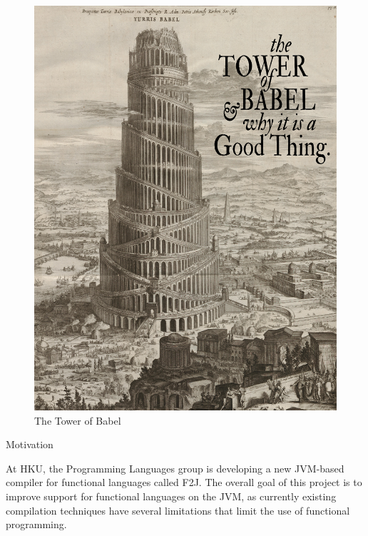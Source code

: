 \documentclass[final]{beamer}
\newlength{\onecolwid}
\begin{document}
\begin{frame}[t]
\begin{columns}[t]
\begin{column}{\onecolwid}
\begin{figure}
\includegraphics[width=\linewidth]{img/babellong.png}
\caption{The Tower of Babel}
\end{figure}


\begin{block}{Motivation}

At HKU, the Programming Languages group is developing a new JVM-based compiler for functional languages called F2J. The overall goal of this project is to improve support for functional languages on the JVM, as currently existing compilation techniques have several limitations that limit the use of functional programming.


\end{block}
\end{column}
\end{columns}
\end{frame}
\end{document}
